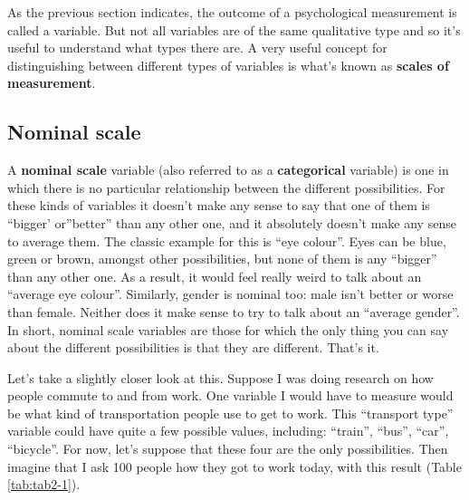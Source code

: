 \documentclass[
]{book}
\begin{document}
As the previous section indicates, the outcome of a psychological measurement is called a variable. But not all variables are of the same qualitative type and so it's useful to understand what types there are. A very useful concept for distinguishing between different types of variables is what's known as \textbf{scales of measurement}.

\hypertarget{nominal-scale}{%
\subsection{Nominal scale}\label{nominal-scale}}

A \textbf{nominal scale} variable (also referred to as a \textbf{categorical} variable) is one in which there is no particular relationship between the different possibilities. For these kinds of variables it doesn't make any sense to say that one of them is ``bigger' or''better'' than any other one, and it absolutely doesn't make any sense to average them. The classic example for this is ``eye colour''. Eyes can be blue, green or brown, amongst other possibilities, but none of them is any ``bigger'' than any other one. As a result, it would feel really weird to talk about an ``average eye colour''. Similarly, gender is nominal too: male isn't better or worse than female. Neither does it make sense to try to talk about an ``average gender''. In short, nominal scale variables are those for which the only thing you can say about the different possibilities is that they are different. That's it.

Let's take a slightly closer look at this. Suppose I was doing research on how people commute to and from work. One variable I would have to measure would be what kind of transportation people use to get to work. This ``transport type'' variable could have quite a few possible values, including: ``train'', ``bus'', ``car'', ``bicycle''. For now, let's suppose that these four are the only possibilities. Then imagine that I ask 100 people how they got to work today, with this result (Table \ref{tab:tab2-1}).

 
  \providecommand{\huxb}[2]{\arrayrulecolor[RGB]{#1}\global\arrayrulewidth=#2pt}
  \providecommand{\huxvb}[2]{\color[RGB]{#1}\vrule width #2pt}
  \providecommand{\huxtpad}[1]{\rule{0pt}{#1}}
  \providecommand{\huxbpad}[1]{\rule[-#1]{0pt}{#1}}
\end{document}
